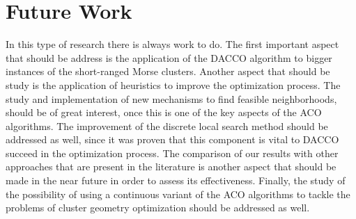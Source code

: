 \section{Future Work}

In this type of research there is always work to do. The first important aspect that should be address is the application of the DACCO algorithm to bigger instances of the short-ranged Morse clusters. Another aspect that should be study is the application of heuristics to improve the optimization process. The study and implementation of new mechanisms to find feasible neighborhoods, should be of great interest, once this is one of the key aspects of the ACO algorithms. The improvement of the discrete local search method should be addressed as well, since it was proven that this component is vital to DACCO succeed in the optimization process. The comparison of our results with other approaches that are present in the literature is another aspect that should be made in the near future in order to assess its effectiveness. Finally, the study of the  possibility of using a continuous variant of the ACO algorithms to tackle the problems of cluster geometry optimization should be addressed as well.





